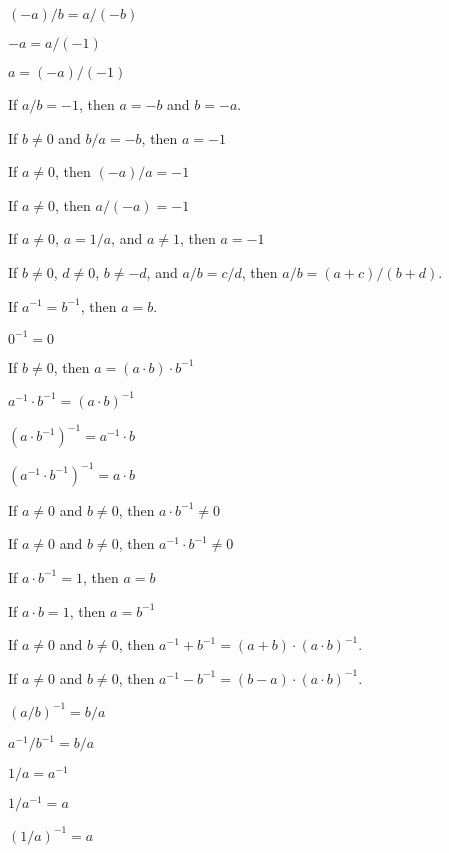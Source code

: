 \documentclass{article}
\begin{document}
\begin{thm}
\item\label{xcmplx1:192} $(-a)/b=a/(-b)$
\item\label{xcmplx1:193} $-a=a/(-1)$
\item\label{xcmplx1:194} $a=(-a)/(-1)$
\item\label{xcmplx1:195} If $a/b=-1$, then $a=-b$ and $b=-a$.
\item\label{xcmplx1:196} If $b\neq0$ and $b/a=-b$, then $a=-1$
\item\label{xcmplx1:197} If $a\neq0$, then $(-a)/a=-1$
\item\label{xcmplx1:198} If $a\neq0$, then $a/(-a)=-1$
\item\label{xcmplx1:199} If $a\neq0$, $a=1/a$, and $a\neq1$, then $a=-1$
\item\label{xcmplx1:200} If $b\neq0$, $d\neq0$, $b\neq-d$, and
  $a/b=c/d$, then $a/b=(a+c)/(b+d)$.
  \bigbreak
\item\label{xcmplx1:201} If $a^{-1}=b^{-1}$, then $a=b$.
\item\label{xcmplx1:202} $0^{-1}=0$
  \bigbreak
\item\label{xcmplx1:203} If $b\neq0$, then $a=(a\cdot b)\cdot b^{-1}$
\item\label{xcmplx1:204} $a^{-1}\cdot b^{-1}=(a\cdot b)^{-1}$
\item\label{xcmplx1:205} $(a\cdot b^{-1})^{-1}=a^{-1}\cdot b$
\item\label{xcmplx1:206} $(a^{-1}\cdot b^{-1})^{-1}=a\cdot b$
\item\label{xcmplx1:207} If $a\neq0$ and $b\neq0$, then $a\cdot b^{-1}\neq0$
\item\label{xcmplx1:208} If $a\neq0$ and $b\neq0$, then $a^{-1}\cdot b^{-1}\neq0$
\item\label{xcmplx1:209} If $a\cdot b^{-1}=1$, then $a=b$
\item\label{xcmplx1:210} If $a\cdot b=1$, then $a=b^{-1}$
  \bigbreak
\item\label{xcmplx1:211} If $a\neq0$ and $b\neq0$, then
  $a^{-1}+b^{-1}=(a+b)\cdot(a\cdot b)^{-1}$.
  \bigbreak
\item\label{xcmplx1:212} If $a\neq0$ and $b\neq0$, then
  $a^{-1}-b^{-1}=(b-a)\cdot(a\cdot b)^{-1}$.
  \bigbreak
\item\label{xcmplx1:213} $(a/b)^{-1}=b/a$
\item\label{xcmplx1:214} $a^{-1}/b^{-1}=b/a$
\item\label{xcmplx1:215} $1/a=a^{-1}$
\item\label{xcmplx1:216} $1/a^{-1}=a$
\item\label{xcmplx1:217} $(1/a)^{-1}=a$

\end{thm}
\end{document}
